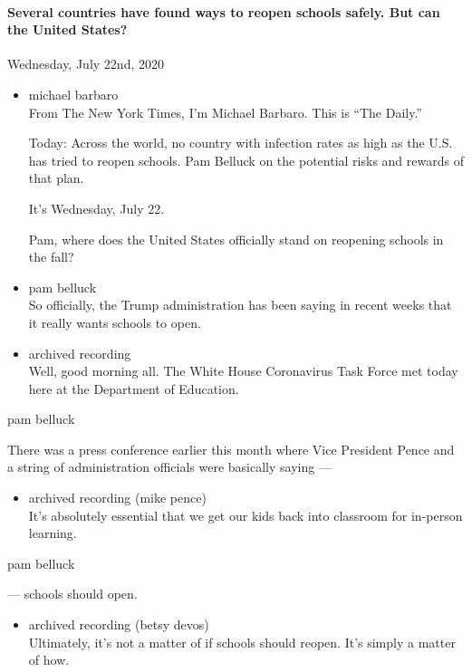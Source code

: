 \hypertarget{several-countries-have-found-ways-to-reopen-schools-safely-but-can-the-united-states}{%
\paragraph{Several countries have found ways to reopen schools safely.
But can the United
States?}\label{several-countries-have-found-ways-to-reopen-schools-safely-but-can-the-united-states}}

Wednesday, July 22nd, 2020

\begin{itemize}
\item
  michael barbaro\\
  From The New York Times, I'm Michael Barbaro. This is ``The Daily.''

  Today: Across the world, no country with infection rates as high as
  the U.S. has tried to reopen schools. Pam Belluck on the potential
  risks and rewards of that plan.

  It's Wednesday, July 22.

  Pam, where does the United States officially stand on reopening
  schools in the fall?
\item
  pam belluck\\
  So officially, the Trump administration has been saying in recent
  weeks that it really wants schools to open.
\item
  archived recording\\
  Well, good morning all. The White House Coronavirus Task Force met
  today here at the Department of Education.
\end{itemize}

pam belluck

There was a press conference earlier this month where Vice President
Pence and a string of administration officials were basically saying ---

\begin{itemize}
\tightlist
\item
  archived recording (mike pence)\\
  It's absolutely essential that we get our kids back into classroom for
  in-person learning.
\end{itemize}

pam belluck

--- schools should open.

\begin{itemize}
\tightlist
\item
  archived recording (betsy devos)\\
  Ultimately, it's not a matter of if schools should reopen. It's simply
  a matter of how.
\end{itemize}

